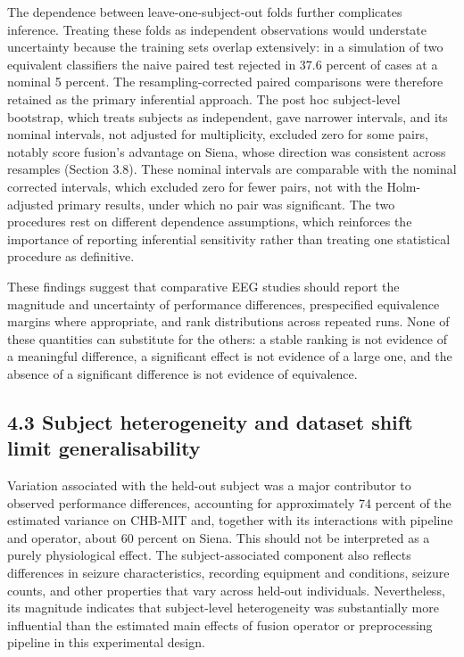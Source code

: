 \documentclass[11pt,a4paper]{article}
\begin{document}
The dependence between leave-one-subject-out folds further complicates inference.
Treating these folds as independent observations would understate uncertainty because
the training sets overlap extensively: in a simulation of two equivalent classifiers the
naive paired test rejected in 37.6 percent of cases at a nominal 5 percent. The
resampling-corrected paired comparisons were therefore retained as the primary
inferential approach. The post hoc subject-level bootstrap, which treats subjects as
independent, gave narrower intervals, and its nominal intervals, not adjusted for
multiplicity, excluded zero for some pairs, notably score fusion's advantage on Siena,
whose direction was consistent across resamples (Section 3.8). These nominal intervals
are comparable with the nominal corrected intervals, which excluded zero for fewer pairs,
not with the Holm-adjusted primary results, under which no pair was significant. The two
procedures rest on different dependence assumptions, which reinforces the importance of reporting inferential sensitivity rather than treating one
statistical procedure as definitive.

These findings suggest that comparative EEG studies should report the magnitude and
uncertainty of performance differences, prespecified equivalence margins where
appropriate, and rank distributions across repeated runs. None of these quantities can
substitute for the others: a stable ranking is not evidence of a meaningful difference, a
significant effect is not evidence of a large one, and the absence of a significant
difference is not evidence of equivalence.

\subsection{4.3 Subject heterogeneity and dataset shift limit generalisability}\label{subject-heterogeneity-and-dataset-shift-limit-generalisability}

Variation associated with the held-out subject was a major contributor to observed
performance differences, accounting for approximately 74 percent of the estimated
variance on CHB-MIT and, together with its interactions with pipeline and operator,
about 60 percent on Siena. This should not be interpreted as a purely physiological
effect. The subject-associated component also reflects differences in seizure
characteristics, recording equipment and conditions, seizure counts, and other
properties that vary across held-out individuals. Nevertheless, its magnitude indicates
that subject-level heterogeneity was substantially more influential than the estimated
main effects of fusion operator or preprocessing pipeline in this experimental design.
\end{document}
